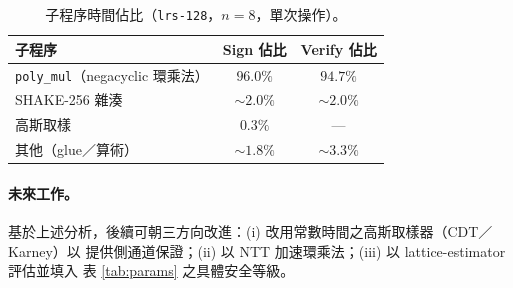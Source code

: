 \begin{table}[ht]
  \centering
  \caption{子程序時間佔比（\texttt{lrs-128}，$n=8$，單次操作）。}
  \label{tab:bottleneck}
  \small
  \begin{tabular}{lcc}
    \toprule
    子程序 & Sign 佔比 & Verify 佔比 \\
    \midrule
    \texttt{poly\_mul}（negacyclic 環乘法） & $96.0\%$ & $94.7\%$ \\
    SHAKE-256 雜湊                          & $\sim 2.0\%$ & $\sim 2.0\%$ \\
    高斯取樣                                & $0.3\%$ & --- \\
    其他（glue／算術）                      & $\sim 1.8\%$ & $\sim 3.3\%$ \\
    \bottomrule
  \end{tabular}
\end{table}

\paragraph{未來工作。}
基於上述分析，後續可朝三方向改進：(i) 改用常數時間之高斯取樣器（CDT／Karney）以
提供側通道保證；(ii) 以 NTT 加速環乘法；(iii) 以 lattice-estimator 評估並填入
表 \ref{tab:params} 之具體安全等級。

